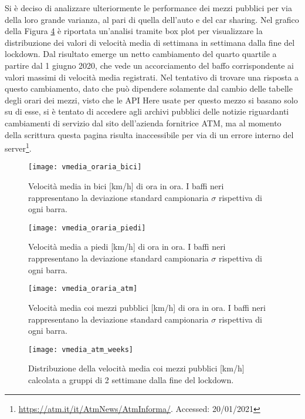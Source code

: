 Si è deciso di analizzare ulteriormente le performance dei mezzi pubblici per via della loro grande varianza, al pari di quella dell'auto e del car sharing. Nel grafico della Figura \ref{image:29} è riportata un'analisi tramite box plot per visualizzare la distribuzione dei valori di velocità media di settimana in settimana dalla fine del lockdown. Dal risultato emerge un netto cambiamento del quarto quartile a partire dal 1 giugno 2020, che vede un accorciamento del baffo corrispondente ai valori massimi di velocità media registrati. Nel tentativo di trovare una risposta a questo cambiamento, dato che può dipendere solamente dal cambio delle tabelle degli orari dei mezzi, visto che le API Here usate per questo mezzo si basano solo su di esse, si è tentato di accedere agli archivi pubblici delle notizie riguardanti cambiamenti di servizio dal sito dell'azienda fornitrice ATM, ma al momento della scrittura questa pagina risulta inaccessibile per via di un errore interno del server\footnote{\url{https://atm.it/it/AtmNews/AtmInforma/}. Accessed: 20/01/2021}.

\begin{figure}[H]
	\centering
	\texttt{[image: vmedia\_oraria\_bici]}
	\caption{Velocità media in bici [km/h] di ora in ora. I baffi neri rappresentano la deviazione standard campionaria $\sigma$ rispettiva di ogni barra.}
	\label{image:11}
\end{figure}

\begin{figure}[H]
	\centering
	\texttt{[image: vmedia\_oraria\_piedi]}
	\caption{Velocità media a piedi [km/h] di ora in ora. I baffi neri rappresentano la deviazione standard campionaria $\sigma$ rispettiva di ogni barra.}
	\label{image:18}
\end{figure}

\begin{figure}
\centering
\texttt{[image: vmedia\_oraria\_atm]}
\caption{Velocità media coi mezzi pubblici [km/h] di ora in ora. I baffi neri rappresentano la deviazione standard campionaria $\sigma$ rispettiva di ogni barra.}
\label{image:17}
\end{figure}

\begin{figure}
\centering
\texttt{[image: vmedia\_atm\_weeks]}
\caption{Distribuzione della velocità media coi mezzi pubblici [km/h] calcolata a gruppi di 2 settimane dalla fine del lockdown.}
\label{image:29}
\end{figure}


